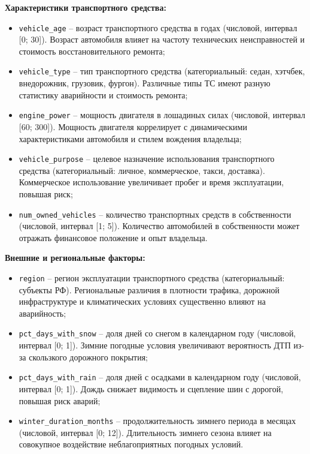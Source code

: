 \textbf{Характеристики транспортного средства:}
\begin{itemize}
    \item \texttt{vehicle\_age} – возраст транспортного средства в годах (числовой, интервал [0; 30]). Возраст автомобиля влияет на частоту технических неисправностей и стоимость восстановительного ремонта;
    \item \texttt{vehicle\_type} – тип транспортного средства (категориальный: седан, хэтчбек, внедорожник, грузовик, фургон). Различные типы ТС имеют разную статистику аварийности и стоимость ремонта;
    \item \texttt{engine\_power} – мощность двигателя в лошадиных силах (числовой, интервал [60; 300]). Мощность двигателя коррелирует с динамическими характеристиками автомобиля и стилем вождения владельца;
    \item \texttt{vehicle\_purpose} – целевое назначение использования транспортного средства (категориальный: личное, коммерческое, такси, доставка). Коммерческое использование увеличивает пробег и время эксплуатации, повышая риск;
    \item \texttt{num\_owned\_vehicles} – количество транспортных средств в собственности (числовой, интервал [1; 5]). Количество автомобилей в собственности может отражать финансовое положение и опыт владельца.
\end{itemize}

\textbf{Внешние и региональные факторы:}
\begin{itemize}
    \item \texttt{region} – регион эксплуатации транспортного средства (категориальный: субъекты РФ). Региональные различия в плотности трафика, дорожной инфраструктуре и климатических условиях существенно влияют на аварийность;
    \item \texttt{pct\_days\_with\_snow} – доля дней со снегом в календарном году (числовой, интервал [0; 1]). Зимние погодные условия увеличивают вероятность ДТП из-за скользкого дорожного покрытия;
    \item \texttt{pct\_days\_with\_rain} – доля дней с осадками в календарном году (числовой, интервал [0; 1]). Дождь снижает видимость и сцепление шин с дорогой, повышая риск аварий;
    \item \texttt{winter\_duration\_months} – продолжительность зимнего периода в месяцах (числовой, интервал [0; 12]). Длительность зимнего сезона влияет на совокупное воздействие неблагоприятных погодных условий.
\end{itemize}

